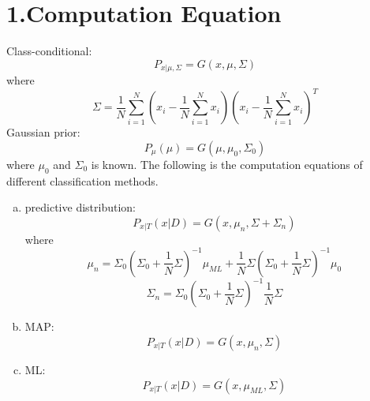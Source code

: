\documentclass[12pt,letterpaper]{article}
\begin{document}
     
    \section*{1.Computation Equation}
    Class-conditional:
    \begin{equation}
        P_{x|\mu,\Sigma}=G(x,\mu,\Sigma) \nonumber
    \end{equation}
    where
    \begin{equation}
        \Sigma=\frac{1}{N}\sum_{i=1}^{N}\left(x_i-\frac{1}{N}\sum_{i=1}^{N}
        x_i\right)\left(x_i-\frac{1}{N}\sum_{i=1}^{N}x_i\right)^T \nonumber
    \end{equation}
    Gaussian prior:
    \begin{equation}
        P_{\mu}(\mu)=G(\mu,\mu_0,\Sigma_0) \nonumber
    \end{equation}
    where $\mu_0$ and $\Sigma_0$ is known. The following is the computation equations
    of different classification methods.
    \begin{enumerate}[a)]
        \item 
        predictive distribution:
        \begin{equation}
            P_{x|T}(x|D)=G(x,\mu_n,\Sigma+\Sigma_n) \nonumber
        \end{equation}
        where
        \begin{equation}
            \mu_n=\Sigma_0\left(\Sigma_0+\frac{1}{N}\Sigma\right)^{-1}
            \mu_{ML}+\frac{1}{N}\Sigma\left(\Sigma_0+\frac{1}{N}\Sigma\right)^{-1}
            \mu_0 \nonumber
        \end{equation}
        \begin{equation}
            \Sigma_n=\Sigma_0\left(\Sigma_0+\frac{1}{N}\Sigma\right)^{-1}
            \frac{1}{N}\Sigma \nonumber
        \end{equation}
        \item 
        MAP:
        \begin{equation}
            P_{x|T}(x|D)=G(x,\mu_n,\Sigma) \nonumber
        \end{equation}
        \item 
        ML:
        \begin{equation}
            P_{x|T}(x|D)=G(x,\mu_{ML},\Sigma) \nonumber
        \end{equation}
    \end{enumerate}
\end{document}
